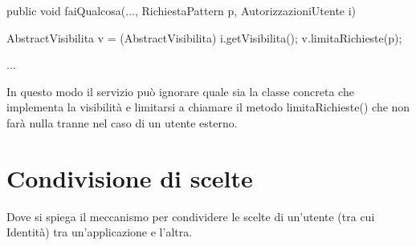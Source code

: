 \begin{java}
public void faiQualcosa(..., RichiestaPattern p, AutorizzazioniUtente i)
{
   AbstractVisibilita v = (AbstractVisibilita) i.getVisibilita();         v.limitaRichieste(p);

  ... 
}

\end{java}

In questo modo il servizio può ignorare quale sia la classe concreta che implementa la visibilità e limitarsi a chiamare il metodo limitaRichieste() che non farà nulla tranne nel caso di un utente esterno.


\section{Condivisione di scelte}
Dove si spiega il meccanismo per condividere le scelte di un'utente (tra cui Identità) tra un'applicazione e l'altra.